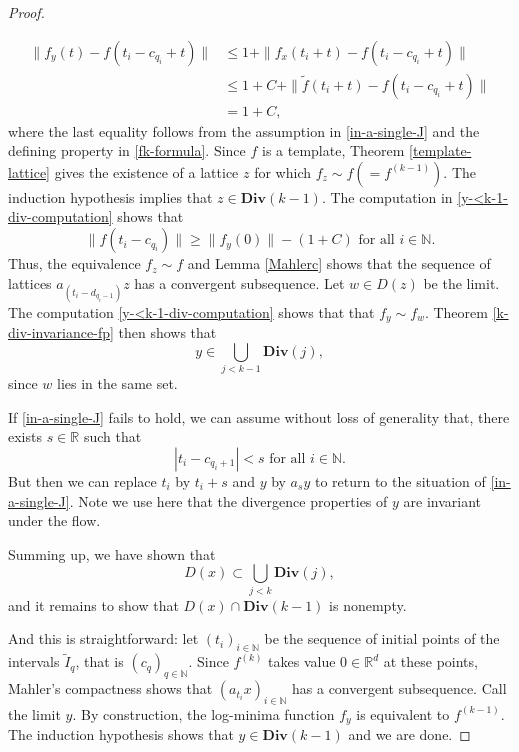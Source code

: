 \documentclass[reqno,11pt]{amsart}
\theoremstyle{plain}
\theoremstyle{definition}
\theoremstyle{remark}
\numberwithin{equation}{section}
\newcommand{\D}{\mathbf{Div}}
\newcommand{\R}{{\mathbb{R}}}
\newcommand{\N}{{\mathbb{N}}}
\begin{document}
\begin{proof}
\begin{enumerate}
\begin{equation}
    \begin{split}
     \|f_y(t) - f(t_i - c_{q_i} + t)\| 
         &\leq 1 + \|f_x(t_i + t) - f(t_i - c_{q_i} + t) \| \\
        &\leq 1 + C + \|\widetilde{f}(t_i +t) - f(t_i - c_{q_i} + t) \| \\
        & = 1 + C,
    \end{split}
    \end{equation}
    where the last equality follows from the assumption in \eqref{in-a-single-J} and the defining property in \eqref{fk-formula}.
    Since $f$ is a template, Theorem \ref{template-lattice} gives the existence of a lattice $z$ for which $f_z \sim f (= f^{(k-1)})$.
    The induction hypothesis implies that $z \in \D(k-1)$. 
    The computation in \eqref{y-<k-1-div-computation} shows that 
    \begin{equation*}
        \|f(t_i-c_{q_i})\| \geq \|f_y(0)\| - (1+C) \text{ for all } i \in \N.
    \end{equation*}
    Thus, the equivalence $f_z\sim f$ and Lemma \ref{Mahlerc} shows that the sequence of lattices $a_{(t_i -d_{q_i-1})}z$ has a convergent subsequence. Let $w \in D(z)$ be the limit.
    The computation \eqref{y-<k-1-div-computation} shows that that $f_y \sim f_w$.
    Theorem \ref{k-div-invariance-fp} then shows that 
    \begin{equation}
        y \in  \bigcup_{j<k-1} \D(j),
    \end{equation}
    since $w$ lies in the same set.
\end{enumerate}
If \eqref{in-a-single-J} fails to hold, we can assume without loss of generality that, there exists $s \in \R$ such that
\begin{equation*}
    |t_i - c_{q_i +1}| < s \text{ for all } i \in \N.
\end{equation*}
But then we can replace $t_i$ by $t_i + s$ and $y$ by $a_s y$ to return to the situation of \eqref{in-a-single-J}. Note we use here that the divergence properties of $y$ are invariant under the flow.

Summing up, we have shown that 
\begin{equation}
    D(x) \subset \bigcup_{j<k} \D(j),
\end{equation}
and it remains to show that $D(x) \cap \D(k-1)$ is nonempty.

And this is straightforward: let $(t_i)_{i \in \N}$ be the sequence of initial points of the intervals $\widetilde{I}_q$, that is $(c_q)_{q \in \N}$.
Since $f^{(k)}$ takes value $0 \in \R^d$ at these points, Mahler's compactness shows that $(a_{t_i}x)_{i \in \N}$ has a convergent subsequence. Call the limit $y$.
By construction, the log-minima function $f_y$ is equivalent to $f^{(k-1)}$.
The induction hypothesis shows that $y \in \D(k-1)$ and we are done.
\end{proof}
\end{document}
